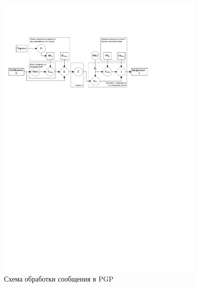 \begin{figure}[!ht]
	\centering
	\includegraphics[width=0.9\textwidth]{pic/pgp}
	\caption{Схема обработки сообщения в PGP\label{fig:pgp}}
\end{figure}

